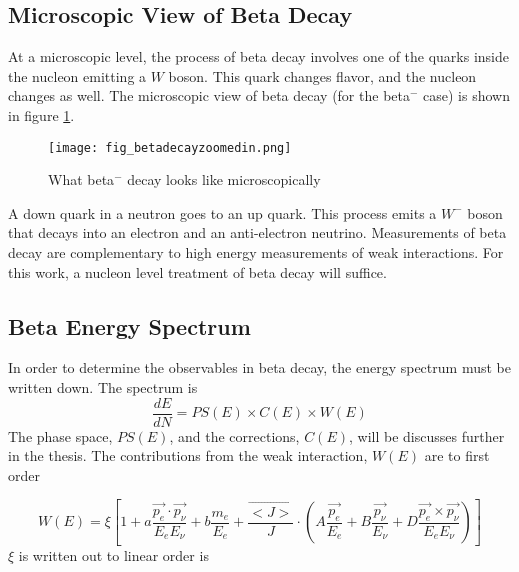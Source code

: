 \documentclass[../MaxHughesThesis.tex]{subfiles}
\begin{document}
\subsection{Microscopic View of Beta Decay}
At a microscopic level, the process of beta decay involves one of the quarks inside the nucleon emitting a $W$ boson. 
This quark changes flavor, and the nucleon changes as well. 
The microscopic view of beta decay (for the beta$^{-}$ case) is shown in figure \ref{fig:betadecaymicro}.

\begin{figure}[!htb]
	\centerline{\texttt{[image: fig\_betadecayzoomedin.png]}}
	\caption{What beta$^{-}$ decay looks like microscopically}
	\label{fig:betadecaymicro}
\end{figure}
A down quark in a neutron goes to an up quark.
This process emits a $W^{-}$ boson that decays into an electron and an anti-electron neutrino.
Measurements of beta decay are complementary to high energy measurements of weak interactions.
For this work, a nucleon level treatment of beta decay will suffice.  

\subsection{Beta Energy Spectrum}
In order to determine the observables in beta decay, the energy spectrum must be written down. 
The spectrum is %
\begin{equation}
	\frac{dE}{dN} = PS(E) \times C(E) \times W(E)  
	\label{eq:betaenspectrum}
\end{equation}
The phase space, $PS(E)$, and the corrections, $C(E)$, will be discusses further in the thesis. 
The contributions from the weak interaction, $W(E)$ are to first order \cite{Jac57} %

\begin{equation}
	 W(E) = \xi [1 + a \frac{\vec{p_{e}} \cdot \vec{p_{\nu}}} {E_{e} E_{\nu}}  +  b \frac{m_{e}}{E_{e}} + \frac{\vec{<J>}}{J} \cdot (A \frac{ \vec{p_{e}} }{E_{e}} + B \frac{\vec{p_{\nu}}}{E_{\nu}} + D \frac{\vec{p_{e}} \times \vec{p_{\nu}}}{E_{e} E_{\nu}})]
	\label{eq:matrixelement}
\end{equation}
$\xi$ is written out to linear order is %
 
\end{document}
